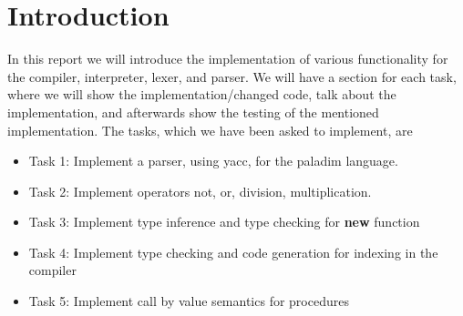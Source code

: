 \section{Introduction}
In this report we will introduce the implementation of various functionality for the compiler, interpreter, lexer, and parser.
We will have a section for each task, where we will show the implementation/changed code,
talk about the implementation, and afterwards show the testing of the mentioned implementation. 
The tasks, which we have been asked to implement, are 

\begin{itemize}
  \item Task 1: Implement a parser, using yacc, for the paladim language.
  \item Task 2: Implement operators not, or, division, multiplication.
  \item Task 3: Implement type inference and type checking for \textbf{new} function
  \item Task 4: Implement type checking and code generation for indexing in the compiler
  \item Task 5: Implement call by value semantics for procedures
\end{itemize}

